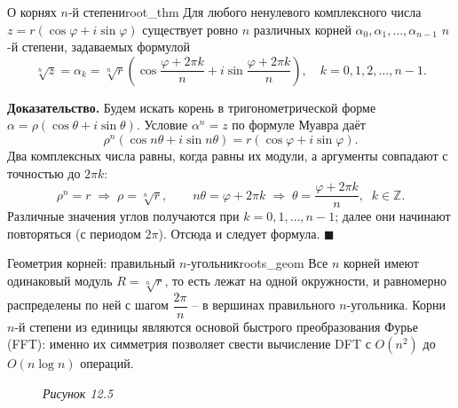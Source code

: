 \documentclass[12pt,a4paper]{article}
\newenvironment{myproof}{\noindent\textbf{Доказательство.}}{\hfill$\blacksquare$}
\begin{document}
\begin{theorem}{О корнях $n$-й степени}{root_thm}
Для любого ненулевого комплексного числа
$z = r(\cos\varphi + i\sin\varphi)$ существует ровно $n$ различных
корней $\alpha_0, \alpha_1, \dots, \alpha_{n-1}$ $n$-й степени,
задаваемых формулой
\[
\sqrt[n]{z} = \alpha_k = \sqrt[n]{r}\!\left(
\cos\frac{\varphi + 2\pi k}{n}
+ i\sin\frac{\varphi + 2\pi k}{n}\right),
\quad k = 0, 1, 2, \dots, n-1.
\]
\end{theorem}

\begin{myproof}
Будем искать корень в тригонометрической форме
$\alpha = \rho(\cos\theta + i\sin\theta)$. Условие $\alpha^n = z$ по
формуле Муавра даёт
\[
\rho^n(\cos n\theta + i\sin n\theta)
= r(\cos\varphi + i\sin\varphi).
\]
Два комплексных числа равны, когда равны их модули, а аргументы
совпадают с точностью до $2\pi k$:
\[
\rho^n = r \;\Rightarrow\; \rho = \sqrt[n]{r}, \qquad
n\theta = \varphi + 2\pi k \;\Rightarrow\;
\theta = \frac{\varphi + 2\pi k}{n}, \;\; k \in \mathbb{Z}.
\]
Различные значения углов получаются при $k = 0, 1, \dots, n-1$;
далее они начинают повторяться (с периодом $2\pi$). Отсюда и следует
формула.
\end{myproof}

\begin{remarkIT}{Геометрия корней: правильный $n$-угольник}{roots_geom}
Все $n$ корней имеют одинаковый модуль $R = \sqrt[n]{r}$, то есть
лежат на одной окружности, и равномерно распределены по ней с шагом
$\dfrac{2\pi}{n}$ -- в вершинах правильного $n$-угольника. Корни
$n$-й степени из единицы являются основой быстрого преобразования
Фурье (FFT): именно их симметрия позволяет свести вычисление DFT с
$O(n^2)$ до $O(n\log n)$ операций.
\end{remarkIT}

\begin{figure}[H]
\centering
{}

\smallskip
\textit{Рисунок 12.5}
\end{figure}
\end{document}
